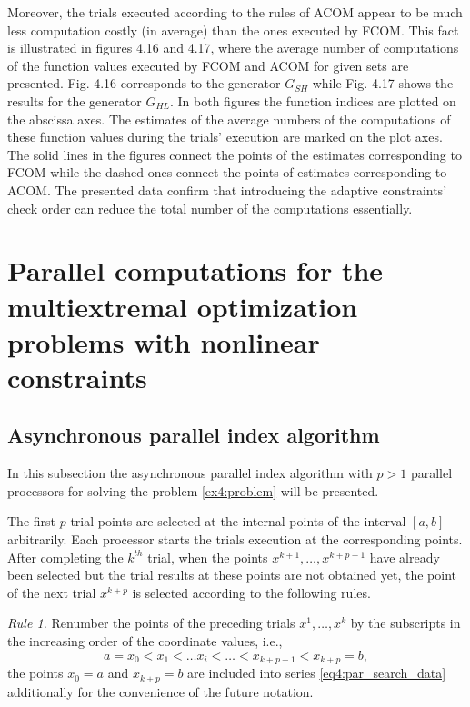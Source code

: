 \documentclass[graybox]{svmult}
\begin{document}
Moreover, the trials executed according to the rules of ACOM appear to be much less computation costly (in average) than the ones executed by FCOM. This fact is illustrated in figures 4.16 and 4.17, where the average number of computations of the function values executed by FCOM and ACOM for given sets are presented. Fig. 4.16 corresponds to the generator $G_{SH}$ while Fig. 4.17 shows the results for the generator $G_{HL}$. In both figures the function indices are plotted on the abscissa axes. The estimates of the average numbers of the computations of these function values during the trials’ execution are marked on the plot axes. The solid lines in the figures connect the points of the estimates corresponding to FCOM while the dashed ones connect the points of estimates corresponding to ACOM. The presented data confirm that introducing the adaptive constraints’ check order can reduce the total number of the computations essentially.

\section{Parallel computations for the multiextremal optimization problems with nonlinear constraints}
\subsection{Asynchronous parallel index algorithm}
In this subsection the asynchronous parallel index algorithm with $p>1$ parallel processors for solving the problem \eqref{ex4:problem} will be presented.

The first $p$ trial points are selected at the internal points of the interval $[a,b]$ arbitrarily. Each processor starts the trials execution at the corresponding points. After completing the $k^{th}$ trial, when the points $x^{k+1},\dots, x^{k+p - 1}$ have already been selected but the trial results at these points are not obtained yet, the point of the next trial $x^{k+p}$ is selected according to the following rules.

\emph{Rule 1.} Renumber the points of the preceding trials $x^1,\dots,x^k$ by the subscripts in the increasing order of the coordinate values, i.e.,
\begin{equation}
  \label{eq4:par_search_data}
  a=x_0<x_1<\dots x_i<\dots<x_{k+p-1}<x_{k+p}=b,
\end{equation}
the points $x_0=a$ and $x_{k + p}=b$ are included into series \eqref{eq4:par_search_data} additionally for the convenience of the future notation.
\end{document}
